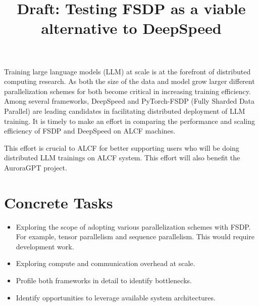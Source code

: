 \documentclass{article}
\title{Draft: Testing FSDP as a viable alternative to DeepSpeed}
\author{}
\begin{document}
\maketitle

Training large language models (LLM) at scale is at the forefront of 
distributed computing research. As both the size of the data and model grow 
larger different parallelization schemes for both become critical in increasing
training efficiency. Among several frameworks, DeepSpeed and 
PyTorch-FSDP (Fully Sharded Data Parallel) are
leading candidates in facilitating distributed deployment of LLM training. It 
is timely to make an effort in comparing the performance and scaling efficiency
of FSDP and DeepSpeed on ALCF machines.

This effort is crucial to ALCF for better supporting users who will be doing 
distributed LLM trainings on ALCF system. This effort will also benefit the 
AuroraGPT project. 

\section*{Concrete Tasks}
\begin{itemize}
    \item Exploring the scope of adopting various parallelization schemes with
        FSDP. For example, tensor parallelism and sequence parallelism. This 
        would require development work.
    \item Exploring compute and communication overhead at scale.
    \item Profile both frameworks in detail to identify bottlenecks.
    \item Identify opportunities to leverage available system architectures.
\end{itemize}
\end{document}
